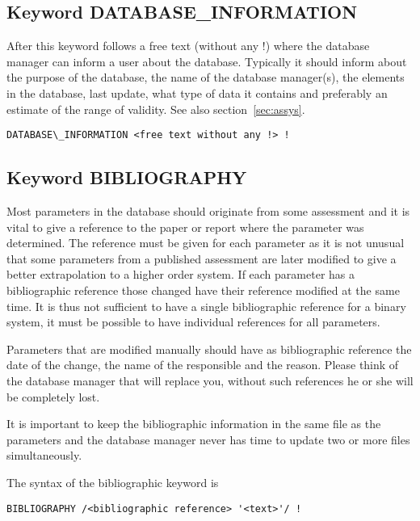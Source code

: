\documentclass[12pt]{article}
\begin{document}
\subsection{Keyword DATABASE\_INFORMATION}\label{sec:info}

After this keyword follows a free text (without any !) where the
database manager can inform a user about the database.  Typically it
should inform about the purpose of the database, the name of the
database manager(s), the elements in the database, last update, what
type of data it contains and preferably an estimate of the range of
validity.  See also section~\ref{sec:assys}.

\begin{verbatim}
DATABASE\_INFORMATION <free text without any !> !
\end{verbatim}

\subsection{Keyword BIBLIOGRAPHY}\label{sec:bib}

Most parameters in the database should originate from some assessment
and it is vital to give a reference to the paper or report where the
parameter was determined.  The reference must be given for each
parameter as it is not unusual that some parameters from a published
assessment are later modified to give a better extrapolation to a
higher order system.  If each parameter has a bibliographic reference
those changed have their reference modified at the same time.  It is
thus not sufficient to have a single bibliographic reference for a
binary system, it must be possible to have individual references for
all parameters.

Parameters that are modified manually should have as bibliographic
reference the date of the change, the name of the responsible and the
reason.  Please think of the database manager that will replace you,
without such references he or she will be completely lost.

It is important to keep the bibliographic information in the same file
as the parameters and the database manager never has time to update
two or more files simultaneously.

The syntax of the bibliographic keyword is

\begin{verbatim}
BIBLIOGRAPHY /<bibliographic reference> '<text>'/ !
\end{verbatim}
\end{document}
